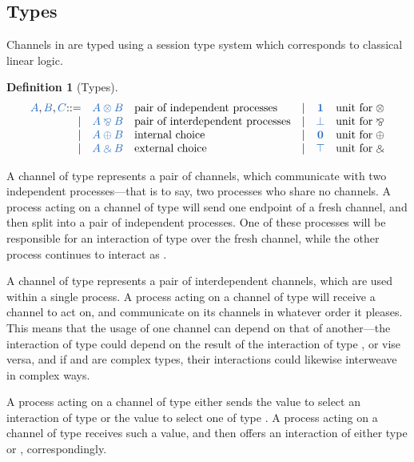 \documentclass[submission,copyright,creativecommons]{eptcs}
\def\Coloneqq{\mathbin{::=}}
\newtheorem{definition}[lemma]{Definition}
\begin{document}
\subsection{Types}
Channels in \cp are typed using a session type system which corresponds to classical linear logic.
\begin{definition}[Types]\label{def:cp-types}
  \[
    \begin{array}{rclrcl}
      \ty{A}, \ty{B}, \ty{C}
           \Coloneqq & \ty{A \tens B} &\text{pair of independent processes}
      &  \mid& \ty{\one}      &\text{unit for} \; {\tens}
      \\ \mid& \ty{A \parr B} &\text{pair of interdependent processes}
      &  \mid& \ty{\bot}      &\text{unit for} \; {\parr}
      \\ \mid& \ty{A \plus B} &\text{internal choice}
      &  \mid& \ty{\nil}      &\text{unit for} \; {\plus}
      \\ \mid& \ty{A \with B} &\text{external choice}
      &  \mid& \ty{\top}      &\text{unit for} \; {\with}
    \end{array}
  \]
\end{definition}\noindent

A channel of type  represents a pair of channels, which communicate with two independent processes---that is to say, two processes who share no channels. A process acting on a channel of type  will send one endpoint of a fresh channel, and then split into a pair of independent processes. One of these processes will be responsible for an interaction of type  over the fresh channel, while the other process continues to interact as .

A channel of type  represents a pair of interdependent channels, which are used within a single process. A process acting on a channel of type  will receive a channel to act on, and communicate on its channels in whatever order it pleases. This means that the usage of one channel can depend on that of another---\eg the interaction of type  could depend on the result of the interaction of type , or vise versa, and if  and  are complex types, their interactions could likewise interweave in complex ways.

A process acting on a channel of type  either sends the value  to select an interaction of type  or the value  to select one of type . 
A process acting on a channel of type  receives such a value, and then offers an interaction of either type  or , correspondingly.
\end{document}
